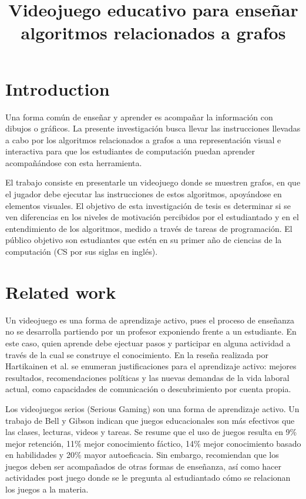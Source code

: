\documentclass[submission]{eptcs}
\title{Videojuego educativo para enseñar algoritmos relacionados a grafos}
\author{ 
\institute{Department of Computer Science\\
University of Chile\\
Santiago, Chile}
\email{}
\email{}
}
\begin{document}
\maketitle

\section{Introduction}
 
Una forma común de enseñar y aprender es acompañar la información con dibujos o gráficos. La presente investigación
busca llevar las instrucciones llevadas a cabo por los algoritmos relacionados a grafos a una
representación visual e interactiva para que los estudiantes de computación puedan aprender acompañándose
con esta herramienta. 

El trabajo consiste en presentarle un videojuego donde se muestren grafos, en que el jugador
debe ejecutar las instrucciones de estos algoritmos, apoyándose en elementos visuales. El objetivo de esta investigación de tesis es 
determinar si se ven diferencias en los niveles de motivación percibidos por el estudiantado y en el entendimiento
de los algoritmos, medido a través de tareas de programación. El público objetivo son estudiantes
que estén en su primer año de ciencias de la computación (CS por sus siglas en inglés).

\section{Related work} 


Un videojuego es una forma de aprendizaje activo, \cite{active_learning_review} pues el proceso de enseñanza no se desarrolla partiendo por un profesor
exponiendo frente a un estudiante. En este caso, quien aprende debe ejectuar pasos y
participar en alguna actividad a través de la cual se construye el conocimiento. En la reseña realizada por Hartikainen et al. \cite{active_learning_review}
se enumeran justificaciones para el aprendizaje activo:  mejores resultados, recomendaciones políticas y las nuevas demandas de la vida laboral actual,
como capacidades de comunicación o descubrimiento por cuenta propia. 

Los videojuegos serios (Serious Gaming) son una forma de aprendizaje activo. Un trabajo de Bell y Gibson \cite{evaluation_of_games_for_teaching_cs} indican que juegos
educacionales son más efectivos que las clases, lecturas, videos y tareas. Se resume que el uso de juegos resulta en 9\% mejor retención, 11\% mejor conocimiento fáctico,
14\% mejor conocimiento basado en habilidades y 20\% mayor autoeficacia. Sin embargo, recomiendan que los juegos deben ser acompañados
de otras formas de enseñanza, así como hacer actividades post juego donde se le pregunta al estudiantado cómo se relacionan los juegos a la materia.
\end{document}
